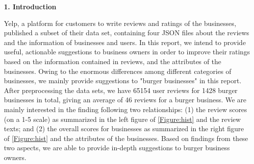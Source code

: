 \documentclass[12pt]{article}
\begin{document}
	
	\noindent\textbf{1. Introduction}
	
	Yelp, a platform for customers to write reviews and ratings of the businesses, published a subset of their data set, containing four JSON files about the reviews and the information of businesses and users. In this report, we intend to provide useful, actionable suggestions to business owners in order to improve their ratings based on the information contained in reviews, and the attributes of the businesses. Owing to the enormous differences among different categories of businesses, we mainly provide suggestions to "burger businesses" in this report. After preprocessing the data sets, we have 65154 user reviews for 1428 burger businesses in total, giving an average of 46 reviews for a burger business. We are mainly interested in the finding following two relationships: (1) the review scores (on a 1-5 scale) as summarized in the left figure of \cref{Figure:hist} and the review texts; and (2) the overall scores for businesses as summarized in the right figure of \cref{Figure:hist} and the attributes of the businesses. Based on findings from these two aspects, we are able to provide in-depth suggestions to burger business owners.
	
\end{document}
